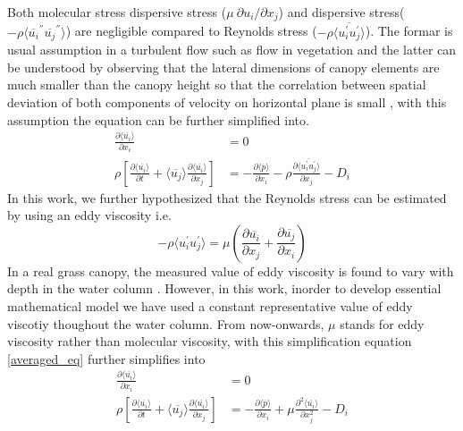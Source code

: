 \documentclass[12pt]{report}   %
\newcommand{\del}{\partial}
\renewcommand{\bar}{\overline}
\begin{document}
 Both molecular stress dispersive stress ($ \mu\ \del u_i / \del x_j $) and dispersive stress($-\rho \langle \bar{u_i}^{''} \bar{u_j}^{''} \rangle $) are negligible compared to Reynolds stress ($-\rho \langle\bar{ u_i^{'} u_j^{'} } \rangle $). The formar is usual assumption in a turbulent flow such as flow in vegetation and the latter can be understood by observing that the
 lateral dimensions of canopy elements are much smaller than the canopy height so that the correlation between spatial deviation of both components of velocity on horizontal plane is small \cite{Raupach94,Raupach96}, with this assumption the equation can be further simplified into.
 \begin{equation}\label{averaged_eq2}
  \begin{split}
  \frac{\partial \langle \bar{u_i} \rangle}{\partial x_i}&=0 \\
 \rho \left[ \frac{\partial \langle \overline{u_i} \rangle }{\partial t}+ \langle \overline{u_j} \rangle \frac{\partial \langle \bar{u_i} \rangle}{\partial x_j} \right ] &= -\frac{\partial \langle \bar{p} \rangle  }{\partial x_i} -\rho \frac{\partial \langle \bar{u_i^{'}u_j^{'}} \rangle }{\partial x_j} -D_i
 \end{split}
\end{equation}
In this work, we further hypothesized that the Reynolds stress can be estimated by using an eddy viscosity i.e. 
\[ -\rho \langle u_i^{'} u_j^{'} \rangle = \mu \left(\frac{\del \bar{u_i} }{\del x_j} + \frac{\del \bar {u_j} }{\del x_i}  \right)\]
In a real grass canopy, the measured value of eddy viscosity is found to vary with depth in the water column \cite{Nepf04}. However, in this work, inorder to develop essential mathematical model we have used a constant representative value of eddy viscotiy thoughout the water column.
From now-onwards, $\mu$ stands for eddy viscosity rather than molecular viscosity, with this simplification equation \ref{averaged_eq} further simplifies into
 \begin{equation}\label{averaged_eq3}
  \begin{split}
  \frac{\partial \langle \bar{u_i} \rangle}{\partial x_i}&=0 \\
 \rho \left[ \frac{\partial \langle \overline{u_i} \rangle }{\partial t}+ \langle \overline{u_j} \rangle \frac{\partial \langle \bar{u_i} \rangle}{\partial x_j} \right ] &= -\frac{\partial \langle \bar{p} \rangle  }{\partial x_i} +\mu \frac{\partial^2 \langle \bar{u_i} \rangle }{\partial x_j^2} - D_i
 \end{split}
\end{equation}
\end{document}
